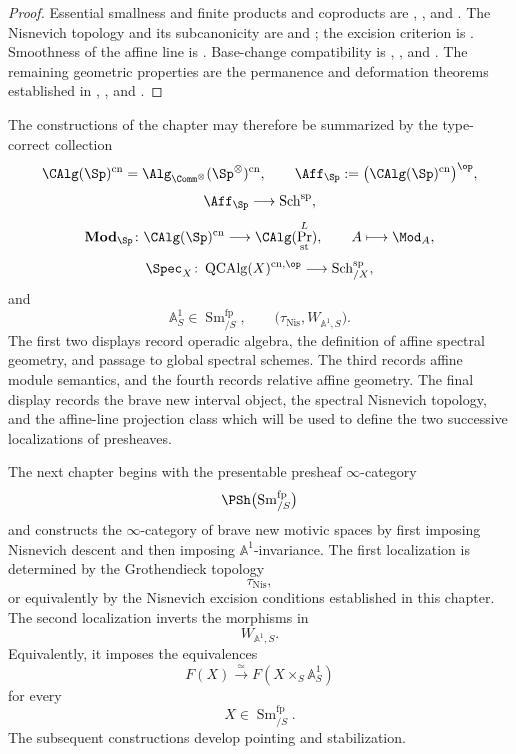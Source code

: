 \begin{proof}
Essential smallness and finite products and coproducts are
,
, and
. The Nisnevich topology and its
subcanonicity are
 and
; the excision criterion is
. Smoothness of the affine line is
. Base-change compatibility is
,
, and
. The remaining geometric
properties are the permanence and deformation theorems established in
,
, and
.
\end{proof}

The constructions of the chapter may therefore be summarized by the
type-correct collection
\[
    \CAlg(\Sp)^{\mathrm{cn}}
    =
    \Alg_{\Comm^\otimes}(\Sp^\otimes)^{\mathrm{cn}},
    \qquad
    \Aff_{\Sp}
    :=
    \bigl(\CAlg(\Sp)^{\mathrm{cn}}\bigr)^{\op},
\]
\[
    \Aff_{\Sp}
    \longrightarrow
    \operatorname{Sch}^{\mathrm{sp}},
\]
\[
    \mathbf{Mod}_{\Sp}
    \colon
    \CAlg(\Sp)^{\mathrm{cn}}
    \longrightarrow
    \CAlg(\Pr^L_{\mathrm{st}}),
    \qquad
    A
    \longmapsto
    \Mod_A,
\]
\[
    \Spec_X
    \colon
    \operatorname{QCAlg}(X)^{\mathrm{cn},\op}
    \longrightarrow
    \operatorname{Sch}^{\mathrm{sp}}_{/X},
\]
and
\[
    \mathbb A^1_S
    \in
    \operatorname{Sm}^{\mathrm{fp}}_{/S},
    \qquad
    \bigl(
        \tau_{\mathrm{Nis}},
        W_{\mathbb A^1,S}
    \bigr).
\]
The first two displays record operadic algebra, the definition of affine
spectral geometry, and passage to global spectral schemes. The third
records affine module semantics, and the fourth records relative affine
geometry. The final display records the brave new interval object,
the spectral Nisnevich topology, and the affine-line projection class
which will be used to define the two successive localizations of
presheaves.

The next chapter begins with the presentable presheaf
\(\infty\)-category
\[
    \PSh
    \bigl(
        \operatorname{Sm}^{\mathrm{fp}}_{/S}
    \bigr)
\]
and constructs the \(\infty\)-category of brave new motivic spaces by
first imposing Nisnevich descent and then imposing
\(\mathbb A^1\)-invariance. The first localization is determined by the
Grothendieck topology
\[
    \tau_{\mathrm{Nis}},
\]
or equivalently by the Nisnevich excision conditions established in
this chapter. The second localization inverts the morphisms in
\[
    W_{\mathbb A^1,S}.
\]
Equivalently, it imposes the equivalences
\[
    F(X)
    \xrightarrow{\simeq}
    F(X\times_S\mathbb A^1_S)
\]
for every
\[
    X
    \in
    \operatorname{Sm}^{\mathrm{fp}}_{/S}.
\]
The subsequent constructions develop pointing and stabilization.

